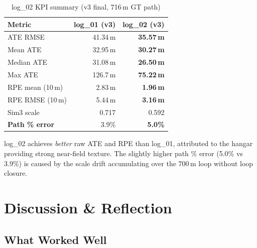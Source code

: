 \documentclass[10pt,a4paper]{article}
\begin{document}
\begin{table}[H]
\centering
\caption{log\_02 KPI summary (v3 final, 716\,m GT path)}
\begin{tabular}{lrr}
\toprule
Metric & log\_01 (v3) & log\_02 (v3) \\
\midrule
ATE RMSE             & 41.34\,m & \textbf{35.57\,m} \\
Mean ATE             & 32.95\,m & \textbf{30.27\,m} \\
Median ATE           & 31.08\,m & \textbf{26.50\,m} \\
Max ATE              & 126.7\,m & \textbf{75.22\,m} \\
RPE mean (10\,m)     & 2.83\,m  & \textbf{1.96\,m} \\
RPE RMSE (10\,m)     & 5.44\,m  & \textbf{3.16\,m} \\
Sim3 scale           & 0.717    & 0.592 \\
\textbf{Path \% error} & 3.9\%  & \textbf{5.0\%} \\
\bottomrule
\end{tabular}
\end{table}

log\_02 achieves \textit{better} raw ATE and RPE than log\_01, attributed to the hangar
providing strong near-field texture. The slightly higher path \% error (5.0\% vs 3.9\%) is
caused by the scale drift accumulating over the 700\,m loop without loop closure.


\section{Discussion \& Reflection}
\label{sec:reflection}

\subsection{What Worked Well}
\end{document}
